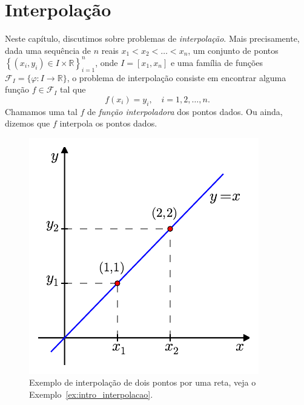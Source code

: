 
%

\chapter{Interpolação}

Neste capítulo, discutimos sobre problemas de \emph{interpolação}. Mais precisamente, dada uma sequência de $n$ reais $x_1<x_2<\ldots<x_n$, um conjunto de pontos $\left\{(x_i, y_i)\in I\times\mathbb{R}\right\}_{i=1}^n$, onde $I=\left[x_1,x_n\right]$ e uma família de funções $\mathcal{F}_I = \{\varphi:I\rightarrow\mathbb{R}\}$, o problema de interpolação consiste em encontrar alguma função $f\in\mathcal{F}_I$ tal que
\begin{equation*}
  f(x_i) = y_i,\quad i=1, 2, \dotsc, n.
\end{equation*}
Chamamos uma tal $f$ de \emph{função interpoladora} dos pontos dados. Ou ainda, dizemos que $f$ interpola os pontos dados.

\begin{figure}
  \centering
  \includegraphics[scale=0.9]{./cap_interp/pics/ex_intro_interpolacao/ex_intro_interpolacao}
  \caption{Exemplo de interpolação de dois pontos por uma reta, veja o Exemplo~\ref{ex:intro_interpolacao}.}\label{fig:ex_intro_interp}
\end{figure}

